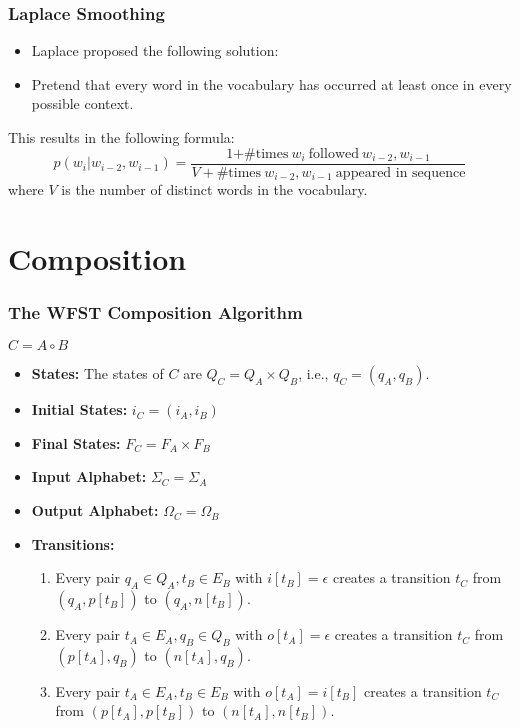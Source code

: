 \documentclass{beamer}
\begin{document}
\begin{frame}
  \frametitle{Laplace Smoothing}
  \begin{itemize}
  \item Laplace proposed the following solution:
  \item Pretend that every word in the vocabulary has occurred at least once in every possible context.
  \end{itemize}
  This results in the following formula:
  \begin{displaymath}
    p(w_i|w_{i-2},w_{i-1})=
    \frac{\mbox{1+\# times}~w_i~\mbox{followed}~w_{i-2},w_{i-1}}{V+\mbox{\# times}~w_{i-2},w_{i-1}~\mbox{appeared in sequence}}
  \end{displaymath}
  where $V$ is the number of distinct words in the vocabulary.
\end{frame}

\section[Composition]{Composition}
\setcounter{subsection}{1}

\begin{frame}
  \frametitle{The WFST Composition Algorithm}
  \centerline{$C = A\circ B$}
  \begin{itemize}
  \item {\bf States:} The states of $C$ are $Q_C=Q_A\times Q_B$,
    i.e., $q_C=(q_A,q_B)$.
  \item {\bf Initial States:} $i_C=(i_A,i_B)$
  \item {\bf Final States:} $F_C=F_A\times F_B$
  \item {\bf Input Alphabet:} $\Sigma_C=\Sigma_A$
  \item {\bf Output Alphabet:} $\Omega_C=\Omega_B$
  \item {\bf Transitions:}
    \begin{enumerate}
    \item Every pair $q_A\in Q_A,t_B\in E_B$ with $i[t_B]=\epsilon$
      creates a transition $t_C$ from $(q_A,p[t_B])$ to
      $(q_A,n[t_B])$.
    \item Every pair $t_A\in E_A,q_B\in Q_B$ with $o[t_A]=\epsilon$
      creates a transition $t_C$ from $(p[t_A],q_B)$ to $(n[t_A],q_B)$.
    \item Every pair $t_A\in E_A,t_B\in E_B$ with $o[t_A]=i[t_B]$ 
      creates a transition $t_C$ from $(p[t_A],p[t_B])$ to
      $(n[t_A],n[t_B])$.
    \end{enumerate}
  \end{itemize}
\end{frame}
\end{document}
